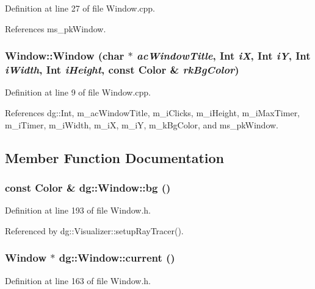 Definition at line 27 of file Window.cpp.

References ms\_\-pk\-Window.
\subsubsection{\setlength{\rightskip}{0pt plus 5cm}Window::Window (char $\ast$ {\em ac\-Window\-Title}, {\bf Int} {\em i\-X}, {\bf Int} {\em i\-Y}, {\bf Int} {\em i\-Width}, {\bf Int} {\em i\-Height}, const {\bf Color} \& {\em rk\-Bg\-Color})\hspace{0.3cm}{\tt  [protected]}}\label{classdg_1_1Window_b0}




Definition at line 9 of file Window.cpp.

References dg::Int, m\_\-ac\-Window\-Title, m\_\-i\-Clicks, m\_\-i\-Height, m\_\-i\-Max\-Timer, m\_\-i\-Timer, m\_\-i\-Width, m\_\-i\-X, m\_\-i\-Y, m\_\-k\-Bg\-Color, and ms\_\-pk\-Window.

\subsection{Member Function Documentation}
\subsubsection{\setlength{\rightskip}{0pt plus 5cm}const {\bf Color} \& dg::Window::bg ()\hspace{0.3cm}{\tt  [inline]}}\label{classdg_1_1Window_a29}




Definition at line 193 of file Window.h.

Referenced by dg::Visualizer::setup\-Ray\-Tracer().
\subsubsection{\setlength{\rightskip}{0pt plus 5cm}Window $\ast$ dg::Window::current ()\hspace{0.3cm}{\tt  [inline, static]}}\label{classdg_1_1Window_d0}




Definition at line 163 of file Window.h.
